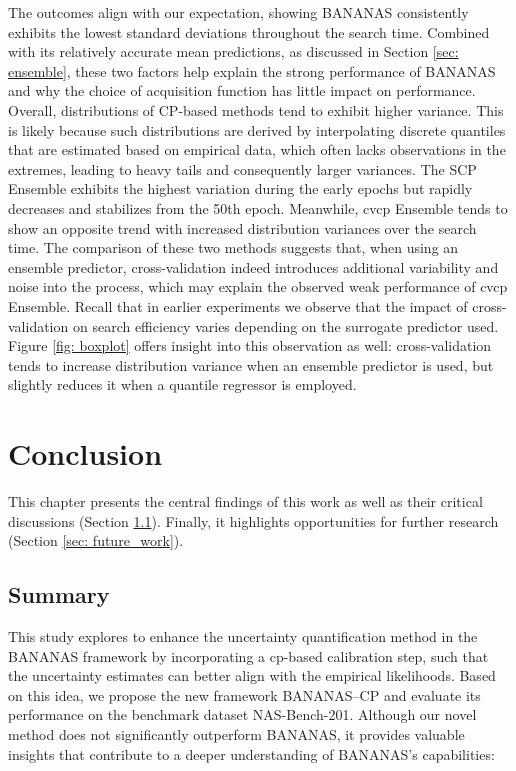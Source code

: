 \documentclass[a4paper,oneside,bibliography=totoc]{scrbook}
\begin{document}
The outcomes align with our expectation, showing BANANAS consistently exhibits the lowest standard deviations throughout the search time. Combined with its relatively accurate mean predictions, as discussed in Section \ref{sec: ensemble}, these two factors help explain the strong performance of BANANAS and why the choice of acquisition function has little impact on performance. Overall, distributions of CP-based methods tend to exhibit higher variance. This is likely because such distributions are derived by interpolating discrete quantiles that are estimated based on empirical data, which often lacks observations in the extremes, leading to heavy tails and consequently larger variances. The SCP Ensemble exhibits the highest variation during the early epochs but rapidly decreases and stabilizes from the 50th epoch. Meanwhile, \gls{cvcp} Ensemble tends to show an opposite trend with  increased distribution variances over the search time. The comparison of these two methods suggests that, when using an ensemble predictor, cross-validation indeed introduces additional variability and noise into the process, which may explain the observed weak performance of \gls{cvcp} Ensemble. Recall that in earlier experiments we observe that the impact of cross-validation on search efficiency varies depending on the surrogate predictor used. Figure \ref{fig: boxplot} offers insight into this observation as well: cross-validation tends to increase distribution variance when an ensemble predictor is used, but slightly reduces it when a quantile regressor is employed.


\chapter{Conclusion}
This chapter presents the central findings of this work as well as their critical discussions (Section \ref{sec: discussion}). Finally, it highlights opportunities for further research (Section \ref{sec: future_work}).

\section{Summary}
\label{sec: discussion}
This study explores to enhance the uncertainty quantification method in the BANANAS framework by incorporating a \gls{cp}-based calibration step, such that the uncertainty estimates can better align with the empirical likelihoods. Based on this idea, we propose the new framework BANANAS--CP and evaluate its performance on the benchmark dataset NAS-Bench-201. Although our novel method does not significantly outperform BANANAS, it provides valuable insights that contribute to a deeper understanding of BANANAS's capabilities:
\end{document}
